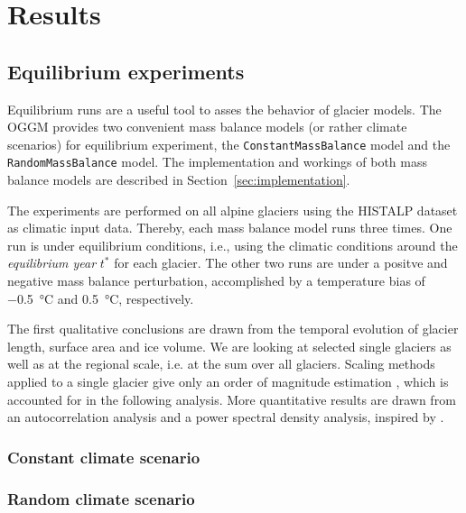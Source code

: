 \chapter{Results}\label{chap:results}
\thispagestyle{plain}

\section{Equilibrium experiments} %
\label{sec:equilibrium_experiments}
    Equilibrium runs are a useful tool to asses the behavior of glacier models. The OGGM provides two convenient mass balance models (or rather climate scenarios) for equilibrium experiment, the \lstinline`ConstantMassBalance` model and the \lstinline`RandomMassBalance` model. The implementation and workings of both mass balance models are described in Section~\ref{sec:implementation}.

    The experiments are performed on all alpine glaciers using the HISTALP dataset \citep{Auer2007} as climatic input data. Thereby, each mass balance model runs three times. One run is under equilibrium conditions, i.e., using the climatic conditions around the \textit{equilibrium year} $t^*$ for each glacier. The other two runs are under a positve and negative mass balance perturbation, accomplished by a temperature bias of \SI{-0.5}{\celsius} and \SI[retain-explicit-plus]{+0.5}{\celsius}, respectively.

    The first qualitative conclusions are drawn from the temporal evolution of glacier length, surface area and ice volume. We are looking at selected single glaciers as well as at the regional scale, i.e. at the sum over all glaciers. Scaling methods applied to a single glacier give only an order of magnitude estimation \citep[section 8.5][cf.]{Bahr2015}, which is accounted for in the following analysis. More quantitative results are drawn from an autocorrelation analysis and a power spectral density analysis, inspired by \citet{Roe2014}.
    
    \subsection{Constant climate scenario} %
    \label{sub:constant_climate_scenario}
    

    \subsection{Random climate scenario} %
    \label{sub:random_climate_scenario}
    
